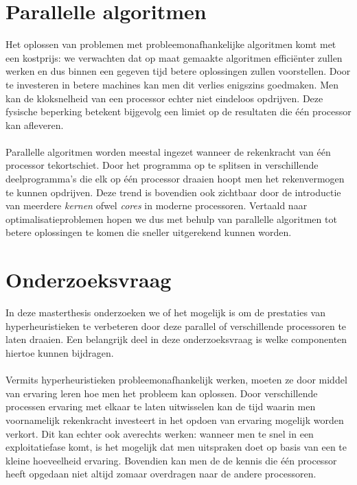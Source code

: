 \section{Parallelle algoritmen}

Het oplossen van problemen met probleemonafhankelijke algoritmen komt met een kostprijs: we verwachten dat op maat gemaakte algoritmen effici\"enter zullen werken en dus binnen een gegeven tijd betere oplossingen zullen voorstellen. Door te investeren in betere machines kan men dit verlies enigszins goedmaken. Men kan de kloksnelheid van een processor echter niet eindeloos opdrijven. Deze fysische beperking betekent bijgevolg een limiet op de resultaten die \'e\'en processor kan afleveren.

\paragraph{}
Parallelle algoritmen worden meestal ingezet wanneer de rekenkracht van \'e\'en processor tekortschiet. Door het programma op te splitsen in verschillende deelprogramma's die elk op \'e\'en processor draaien hoopt men het rekenvermogen te kunnen opdrijven. Deze trend is bovendien ook zichtbaar door de introductie van meerdere \emph{kernen} ofwel \emph{cores} in moderne processoren. Vertaald naar optimalisatieproblemen hopen we dus met behulp van parallelle algoritmen tot betere oplossingen te komen die sneller uitgerekend kunnen worden.

\section{Onderzoeksvraag}

In deze masterthesis onderzoeken we of het mogelijk is om de prestaties van hyperheuristieken te verbeteren door deze parallel of verschillende processoren te laten draaien. Een belangrijk deel in deze onderzoeksvraag is welke componenten hiertoe kunnen bijdragen.

\paragraph{}
Vermits hyperheuristieken probleemonafhankelijk werken, moeten ze door middel van ervaring leren hoe men het probleem kan oplossen. Door verschillende processen ervaring met elkaar te laten uitwisselen kan de tijd waarin men voornamelijk rekenkracht investeert in het opdoen van ervaring mogelijk worden verkort. Dit kan echter ook averechts werken: wanneer men te snel in een exploitatiefase komt, is het mogelijk dat men uitspraken doet op basis van een te kleine hoeveelheid ervaring. Bovendien kan men de de kennis die \'e\'en processor heeft opgedaan niet altijd zomaar overdragen naar de andere processoren.

